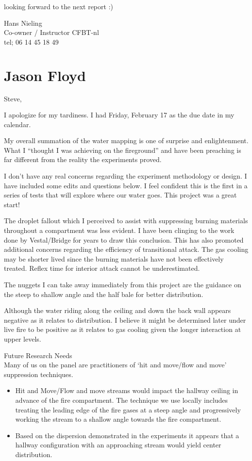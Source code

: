 \documentclass[12pt,oneside]{book}
\begin{document}
\begin{appendix}
looking forward to the next report :)
 

Hans Nieling \\
Co-owner / Instructor CFBT-nl \\
tel; 06 14 45 18 49 \\

\section{Jason Floyd}

Steve, 

I apologize for my tardiness. I had Friday, February 17 as the due date in my calendar.
 
My overall summation of the water mapping is one of surprise and enlightenment. What I ``thought I was achieving on the fireground'' and have been preaching is far different from the reality the experiments proved.
 
I don't have any real concerns regarding the experiment methodology or design. I have included some edits and questions below. I feel confident this is the first in a series of tests that will explore where our water goes. This project was a great start!
 
The droplet fallout which I perceived to assist with suppressing burning materials throughout a compartment was less evident. I have been clinging to the work done by Vestal/Bridge for years to draw this conclusion. This has also promoted additional concerns regarding the efficiency of transitional attack. The gas cooling may be shorter lived since the burning materials have not been effectively treated. Reflex time for interior attack cannot be underestimated.
 
The nuggets I can take away immediately from this project are the guidance on the steep to shallow angle and the half bale for better distribution.
 
Although the water riding along the ceiling and down the back wall appears negative as it relates to distribution. I believe it might be determined later under live fire to be positive as it relates to gas cooling given the longer interaction at upper levels.

Future Research Needs \\
Many of us on the panel are practitioners of `hit and move/flow and move' suppression techniques.
\begin{itemize}
\item Hit and Move/Flow and move streams would impact the hallway ceiling in advance of the fire compartment. The technique we use locally includes treating the leading edge of the fire gases at a steep angle and progressively working the stream to a shallow angle towards the fire compartment. 
\item Based on the dispersion demonstrated in the experiments it appears that a hallway configuration with an approaching stream would yield center distribution. 
\end{itemize}


\end{appendix}
\end{document}
